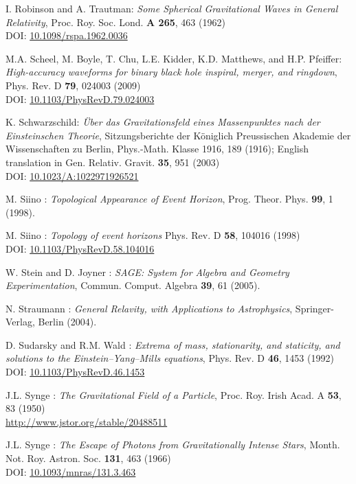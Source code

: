 \begin{thebibliography}{123}
I. Robinson and A. Trautman: {\em Some Spherical Gravitational Waves in General Relativity},
Proc. Roy. Soc. Lond. {\bf A 265}, 463 (1962)\\
DOI: \href{http://dx.doi.org/10.1098/rspa.1962.0036}{10.1098/rspa.1962.0036}

M.A. Scheel, M. Boyle, T. Chu, L.E. Kidder, K.D. Matthews, and H.P. Pfeiffer:
{\em High-accuracy waveforms for binary black hole inspiral, merger, and ringdown},
Phys. Rev. D {\bf 79}, 024003 (2009)\\
DOI: \href{http://dx.doi.org/10.1103/PhysRevD.79.024003}{10.1103/PhysRevD.79.024003}

K. Schwarzschild:
{\em \"Uber das Gravitationsfeld eines Massenpunktes nach der Einsteinschen Theorie},
Sitzungsberichte der K\"oniglich Preussischen Akademie der Wissenschaften zu Berlin, Phys.-Math. Klasse 1916, 189 (1916);
English translation in Gen. Relativ. Gravit. {\bf 35}, 951 (2003)\\
DOI: \href{http://dx.doi.org/10.1023/A:1022971926521}{10.1023/A:1022971926521}

M. Siino : {\em Topological Appearance of Event Horizon},
Prog. Theor. Phys. {\bf 99}, 1 (1998).

M. Siino : {\em Topology of event horizons}
Phys. Rev. D {\bf 58}, 104016 (1998)\\
DOI: \href{http://dx.doi.org/10.1103/PhysRevD.58.104016}{10.1103/PhysRevD.58.104016}

W. Stein and D. Joyner : {\em SAGE: System for Algebra and Geometry Experimentation},
Commun. Comput. Algebra {\bf 39}, 61 (2005).

N. Straumann : \emph{General Relavity, with Applications to Astrophysics},
Springer-Verlag, Berlin (2004).

D. Sudarsky and R.M. Wald : {\em Extrema of mass, stationarity, and staticity,
and solutions to the Einstein–Yang–Mills equations},
Phys. Rev. D {\bf 46}, 1453 (1992)\\
DOI: \href{https://doi.org/10.1103/PhysRevD.46.1453}{10.1103/PhysRevD.46.1453}

J.L. Synge : {\em The Gravitational Field of a Particle},
Proc. Roy. Irish Acad. A {\bf 53}, 83 (1950)\\
\url{http://www.jstor.org/stable/20488511}

J.L. Synge : {\em The Escape of Photons from Gravitationally Intense Stars},
Month. Not. Roy. Astron. Soc. {\bf 131}, 463 (1966)\\
DOI: \href{https://doi.org/10.1093/mnras/131.3.463}{10.1093/mnras/131.3.463}


\end{thebibliography}
